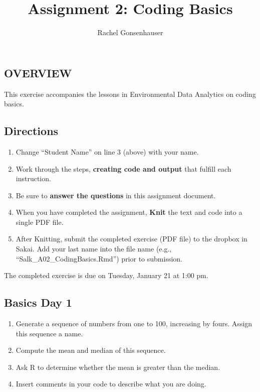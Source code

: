 \documentclass[]{article}
\title{Assignment 2: Coding Basics}
\author{Rachel Gonsenhauser}
\date{}
\providecommand{\tightlist}{%
  \setlength{\itemsep}{0pt}\setlength{\parskip}{0pt}}
\begin{document}
\maketitle

\hypertarget{overview}{%
\subsection{OVERVIEW}\label{overview}}

This exercise accompanies the lessons in Environmental Data Analytics on
coding basics.

\hypertarget{directions}{%
\subsection{Directions}\label{directions}}

\begin{enumerate}
\def\labelenumi{\arabic{enumi}.}
\tightlist
\item
  Change ``Student Name'' on line 3 (above) with your name.
\item
  Work through the steps, \textbf{creating code and output} that fulfill
  each instruction.
\item
  Be sure to \textbf{answer the questions} in this assignment document.
\item
  When you have completed the assignment, \textbf{Knit} the text and
  code into a single PDF file.
\item
  After Knitting, submit the completed exercise (PDF file) to the
  dropbox in Sakai. Add your last name into the file name (e.g.,
  ``Salk\_A02\_CodingBasics.Rmd'') prior to submission.
\end{enumerate}

The completed exercise is due on Tuesday, January 21 at 1:00 pm.

\hypertarget{basics-day-1}{%
\subsection{Basics Day 1}\label{basics-day-1}}

\begin{enumerate}
\def\labelenumi{\arabic{enumi}.}
\item
  Generate a sequence of numbers from one to 100, increasing by fours.
  Assign this sequence a name.
\item
  Compute the mean and median of this sequence.
\item
  Ask R to determine whether the mean is greater than the median.
\item
  Insert comments in your code to describe what you are doing.
\end{enumerate}
\end{document}
